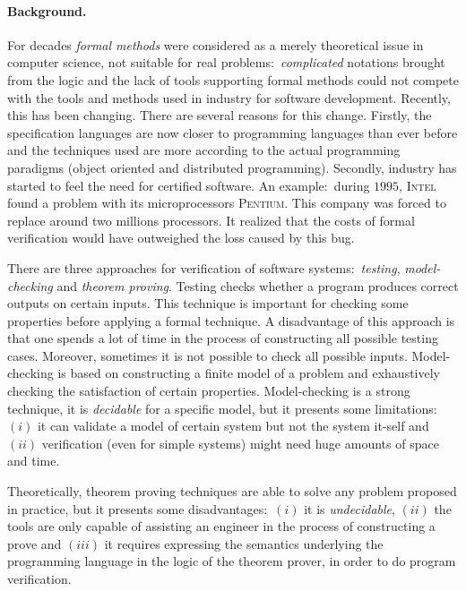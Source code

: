 \documentclass[a4paper]{llncs}
\begin{document}
\paragraph{\bf Background.}
For decades \emph{formal methods} were considered as a merely
theoretical issue in computer science, not suitable for real
problems$:$ \emph{complicated} notations brought from the logic and
the lack of tools supporting formal methods could not compete with the
tools and methods used in industry for software development. Recently, 
this has been changing. There are several reasons for this
change. Firstly, the specification languages are now closer to
programming languages than ever before and the techniques used are
more according to the actual programming paradigms (object oriented
and distributed programming). Secondly, industry has started to feel
the need for certified software. An example$:$ during $1995$,
\textsc{Intel} found a problem with its microprocessors
\textsc{Pentium}. This company was forced to replace around two
millions processors. It realized that the costs of formal
verification would have outweighed the loss caused by this
bug. 

There are three approaches for verification of software systems$:$
\textit{testing}, \textit{model-checking} and
\textit{theorem proving}. Testing checks whether a program produces
correct outputs on certain inputs. This technique is important for
checking some properties before applying a formal technique. A
disadvantage of this approach is that one spends a lot of time in the
process of constructing all possible testing cases. Moreover,
sometimes it is not possible to check all possible
inputs. Model-checking is based on constructing a finite model of a
problem and exhaustively checking the satisfaction of certain
properties. Model-checking is
a strong technique, it is \emph{decidable} for a specific
model, but it presents some limitations$:$ $(i)$ it can validate a
model of certain system but not the system it-self and $(ii)$
verification (even for simple systems) might need huge amounts of
space and time. 

Theoretically, theorem proving techniques are able to
solve any problem proposed in practice, but it presents some
disadvantages$:$ $(i)$ it is \emph{undecidable}, $(ii)$ the tools are
only capable of assisting an engineer in the process of constructing a
prove and $(iii)$ it requires expressing the semantics underlying the
programming language in the logic of the theorem prover, in order to
do program verification. 
\end{document}

